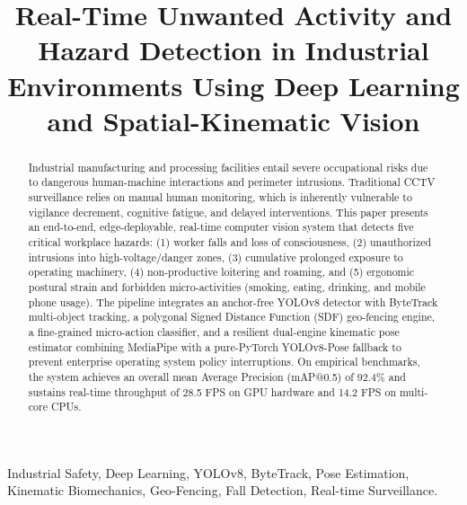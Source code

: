 \documentclass[conference]{IEEEtran}
\begin{document}
\title{Real-Time Unwanted Activity and Hazard Detection in Industrial Environments Using Deep Learning and Spatial-Kinematic Vision}

\author{
}

\maketitle

\begin{abstract}
Industrial manufacturing and processing facilities entail severe occupational risks due to dangerous human-machine interactions and perimeter intrusions. Traditional CCTV surveillance relies on manual human monitoring, which is inherently vulnerable to vigilance decrement, cognitive fatigue, and delayed interventions. This paper presents an end-to-end, edge-deployable, real-time computer vision system that detects five critical workplace hazards: (1) worker falls and loss of consciousness, (2) unauthorized intrusions into high-voltage/danger zones, (3) cumulative prolonged exposure to operating machinery, (4) non-productive loitering and roaming, and (5) ergonomic postural strain and forbidden micro-activities (smoking, eating, drinking, and mobile phone usage). The pipeline integrates an anchor-free YOLOv8 detector with ByteTrack multi-object tracking, a polygonal Signed Distance Function (SDF) geo-fencing engine, a fine-grained micro-action classifier, and a resilient dual-engine kinematic pose estimator combining MediaPipe with a pure-PyTorch YOLOv8-Pose fallback to prevent enterprise operating system policy interruptions. On empirical benchmarks, the system achieves an overall mean Average Precision (mAP@0.5) of 92.4\% and sustains real-time throughput of 28.5 FPS on GPU hardware and 14.2 FPS on multi-core CPUs.
\end{abstract}

\begin{IEEEkeywords}
Industrial Safety, Deep Learning, YOLOv8, ByteTrack, Pose Estimation, Kinematic Biomechanics, Geo-Fencing, Fall Detection, Real-time Surveillance.
\end{IEEEkeywords}
\end{document}

